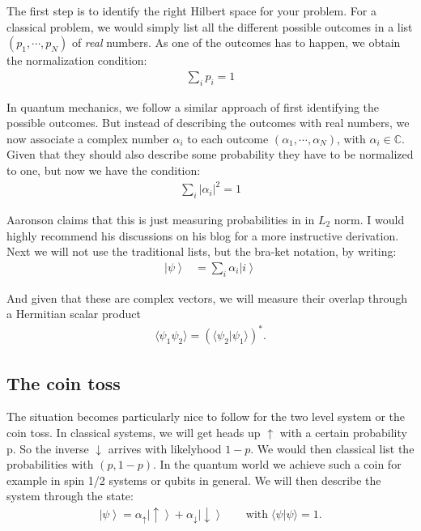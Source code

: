 \documentclass[10pt]{article}
\let\cite\citep
\providecommand\citep{\cite}
\newcommand{\ket}[1]{\ensuremath{\left|#1\right\rangle}}
\begin{document}
The first step is to identify the right Hilbert space for your problem. For a classical problem, we would simply list all the different possible outcomes in a list $(p_1, \cdots, p_N)$ of \textit{real} numbers. As one of the outcomes has to happen, we obtain the normalization condition:
\begin{align}
\sum_i p_i = 1
\end{align}

In quantum mechanics, we follow a similar approach of first identifying the possible outcomes. But instead of describing the outcomes with real numbers, we now associate a complex number $\alpha_i$ to each outcome $(\alpha_1, \cdots, \alpha_N)$, with $\alpha_i \in \mathbb{C}$. Given that they should also describe some probability they have to be normalized to one, but now we have the condition:
\begin{align}
\sum_i |\alpha_i|^2 = 1
\end{align}

Aaronson claims that this is just measuring probabilities in in $L_2$ norm. I would highly recommend his discussions on his blog for a more instructive derivation\cite{quantum}. Next we will not use the traditional lists, but the bra-ket notation, by writing:
\begin{align}
\ket{\psi}&= \sum_i \alpha_i \ket{i}
\end{align}

And given that these are complex vectors, we will measure their overlap through a Hermitian scalar product
\begin{align}
\langle\psi_1 \psi_2\rangle=(\langle{\psi_2}| \psi_1\rangle)^*.
\end{align}
\subsection{The coin toss}
The situation becomes particularly nice to follow for the two level system or the coin toss. In classical systems, we will get heads up $\uparrow$ with a certain probability p. So the inverse $\downarrow$ arrives with likelyhood $1-p$. We would then classical list the probabilities with $(p,1-p)$. In the quantum world we achieve such a coin for example in spin 1/2 systems or qubits in general. We will then describe the system through the state:
\begin{align}
\ket{\psi} = \alpha_\uparrow \ket{\uparrow} + \alpha_\downarrow \ket{\downarrow}  \qquad \text{with} \; \langle\psi | \psi\rangle = 1.
\end{align}
\end{document}
